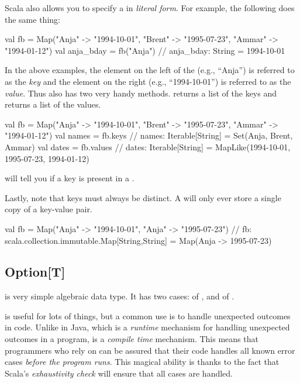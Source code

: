 \documentclass{book}
\begin{document}
Scala also allows you to specify a  in \emph{literal form}.  For example, the following does the same thing:

\begin{scalacode}
val fb = Map("Anja" -> "1994-10-01", "Brent" -> "1995-07-23", "Ammar" -> "1994-01-12")
val anja_bday = fb("Anja")
// anja_bday: String = 1994-10-01
\end{scalacode}

In the above examples, the element on the left of the \scalainline{->} (e.g., ``Anja'') is referred to as the \emph{key} and the element on the right (e.g., ``1994-10-01'') is referred to as the \emph{value}.  Thus  also has two very handy methods.   returns a list of the keys and  returns a list of the values.

\begin{scalacode}
val fb = Map("Anja" -> "1994-10-01", "Brent" -> "1995-07-23", "Ammar" -> "1994-01-12")
val names = fb.keys
// names: Iterable[String] = Set(Anja, Brent, Ammar)
val dates = fb.values
// dates: Iterable[String] = MapLike(1994-10-01, 1995-07-23, 1994-01-12)
\end{scalacode}

 will tell you if a key is present in a .

Lastly, note that keys must always be distinct.  A  will only ever store a single copy of a key-value pair.

\begin{scalacode}
val fb = Map("Anja" -> "1994-10-01", "Anja" -> "1995-07-23")
// fb: scala.collection.immutable.Map[String,String] = Map(Anja -> 1995-07-23)
\end{scalacode}


\subsection{Option[T]}

 is very simple algebraic data type.  It has two cases:  of , and  of .

 is useful for lots of things, but a common use is to handle unexpected outcomes in code.  Unlike  in Java, which is a \emph{runtime} mechanism for handling unexpected outcomes in a program,  is a \emph{compile time} mechanism.  This means that programmers who rely on  can be assured that their code handles all known error cases \emph{before the program runs}.  This magical ability is thanks to the fact that Scala's \emph{exhaustivity check} will ensure that all cases are handled.
\end{document}

